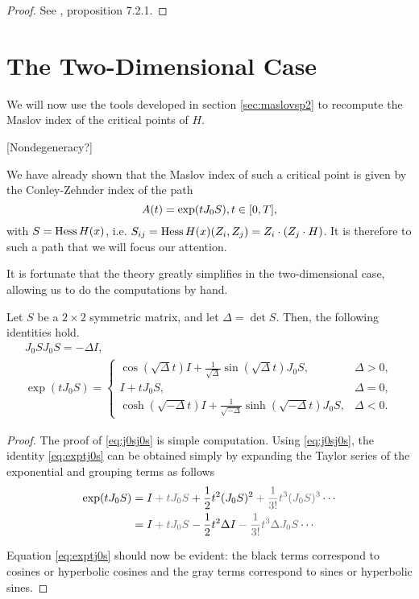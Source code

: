 \begin{proof}
See \cite{audin}, proposition 7.2.1.
\end{proof}

\section{The Two-Dimensional Case}

We will now use the tools developed in section \ref{sec:maslovsp2} to recompute the Maslov index of the critical points of $H$.

[Nondegeneracy?]

We have already shown that the Maslov index of such a critical point is given by the Conley-Zehnder index of the path
\begin{equation}
A(t) = \exp(t J_0 S), t \in \interval 0 T,
\end{equation}
with $S = \operatorname{Hess} H(x)$, i.e. $S_{ij} = \operatorname{Hess} H(x)(Z_i, Z_j) = Z_i \cdot (Z_j \cdot H)$. It is therefore to such a path that we will focus our attention.

It is fortunate that the theory greatly simplifies in the two-dimensional case, allowing us to do the computations by hand.

\begin{prop}\label{prop:sidentities}
Let $S$ be a $2 \times 2$ symmetric matrix, and let $\Delta = \det S$. Then, the following identities hold.
\begin{gather}
J_0 S J_0 S = - \Delta I, \label{eq:j0sj0s}\\
\exp(t J_0 S) = \begin{cases}
\cos(\sqrt{\Delta} t) I + \frac1{\sqrt{\Delta}} \sin(\sqrt{\Delta} t) J_0 S, & \Delta > 0,\\
I + t J_0 S, & \Delta = 0,\\
\cosh(\sqrt{-\Delta} t) I + \frac1{\sqrt{-\Delta}} \sinh(\sqrt{-\Delta} t) J_0 S, & \Delta < 0.
\end{cases} \label{eq:exptj0s}
\end{gather}
\end{prop}

\begin{proof}
The proof of \eqref{eq:j0sj0s} is simple computation. Using \eqref{eq:j0sj0s}, the identity \eqref{eq:exptj0s} can be obtained simply by expanding the Taylor series of the exponential and grouping terms as follows
\begin{equation}
\begin{aligned}
\exp(t J_0 S) &= 
I \color{black!60} + t J_0 S \color{black} + \frac12 t^2 (J_0 S)^2 \color{black!60} +\frac1{3!} t^3 (J_0 S)^3 \color{black} \cdots \\
&= 
I \color{black!60} + t J_0 S \color{black} - \frac12 t^2 \Delta I \color{black!60} -\frac1{3!} t^3 \Delta J_0 S \color{black} \cdots
\end{aligned}
\end{equation}

Equation \eqref{eq:exptj0s} should now be evident: the black terms correspond to cosines or hyperbolic cosines and the gray terms correspond to sines or hyperbolic sines.
\end{proof}

